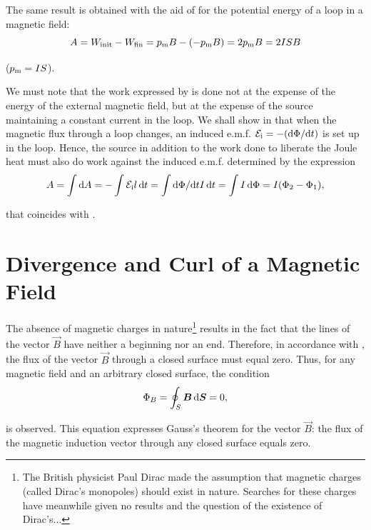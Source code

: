 \noindent
The same result is obtained with the aid of  for the potential energy of a loop in a magnetic field:
\begin{equation*}
    A = W_{\text{init}} - W_{\text{fin}} = p_{\text{m}} B - (- p_{\text{m}} B) = 2 p_{\text{m}} B = 2 I S B
\end{equation*}

\noindent
($p_{\text{m}}=IS$).

We must note that the work expressed by  is done not at the expense of the energy of the external magnetic field, but at the expense of the source maintaining a constant current in the loop. We shall show in  that when the magnetic flux through a loop changes, an induced e.m.f. $\mathcal{E}_{\text{i}}=-(\mathrm{d}\Phi/\mathrm{d} t)$ is set up in the loop. Hence, the source in addition to the work done to liberate the Joule heat must also do work against the induced e.m.f. determined by the expression
\begin{equation*}
    A = \int \mathrm{d} A = -\int \mathcal{E}_{\text{i}} l\, \mathrm{d} t = \int \mathrm{d}\Phi/\mathrm{d} t I\, \mathrm{d} t = \int I\, \mathrm{d}\Phi = I (\Phi_2 - \Phi_1),
\end{equation*}

\noindent
that coincides with .

\section{Divergence and Curl of a Magnetic Field}\label{sec:6_11}

The absence of magnetic charges in nature\footnote{The British physicist Paul Dirac made the assumption that magnetic charges (called Dirac's monopoles) should exist in nature. Searches for these charges have meanwhile given no results and the question of the existence of Dirac's...} results in the fact that the lines of the vector $\vec{B}$ have neither a beginning nor an end. Therefore, in accordance with , the flux of the vector $\vec{B}$ through a closed surface must equal zero. Thus, for any magnetic field and an arbitrary closed surface, the condition
\begin{equation}\label{eq:6_95}
    \Phi_B = \oint_S \boldsymbol{B}\, \mathrm{d}\boldsymbol{S} = 0,
\end{equation}

\noindent
is observed. This equation expresses Gauss's theorem for the vector $\vec{B}$: the flux of the magnetic induction vector through any closed surface equals zero.

